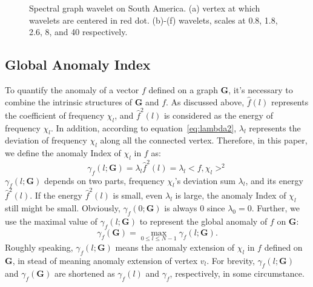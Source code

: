 \begin{figure}[t]
{		\label{fig:brazil5}
	}
	\caption{Spectral graph wavelet on South America. (a) vertex at which wavelets are centered in red dot. (b)-(f) wavelets, scales at 0.8, 1.8, 2.6, 8, and 40 respectively.}
	\label{fig:example2}
\end{figure}


\subsection{Global Anomaly Index}
\label{sec:signal_anomaly_on_Graph}

To quantify the anomaly of a vector $f$ defined on a graph $\mathbf{G}$, it's necessary to combine the intrinsic structures of $\mathbf{G}$ and $f$. As discussed above, $\hat{f}(l)$ represents the coefficient of frequency $\chi_l$, and $\hat{f}^2(l)$ is considered as the energy of frequency $\chi_l$. In addition, according to equation~\ref{eq:lambda2}, $\lambda_l$ represents the deviation of frequency $\chi_l$ along all the connected vertex. Therefore, in this paper, we define the anomaly Index of $\chi_l$ in $f$ as:
\begin{equation}
\label{eq:lambda3}
\gamma_f(l;\mathbf{G})=\lambda_l\hat{f}^2(l)= \lambda_l<f,\chi_l>^2
\end{equation}
$\gamma_f(l;\mathbf{G})$ depends on two parts, frequency $\chi_l$'s deviation sum $\lambda_l$, and its energy $\hat{f}^2(l)$. If the energy $\hat{f}^2(l)$ is small, even $\lambda_l$ is large, the anomaly Index of $\chi_l$ still might be small. Obviously, $\gamma_f(0;\mathbf{G})$ is always $0$ since $\lambda_0=0$. Further, we use the maximal value of $\gamma_f(l;\mathbf{G})$ to represent the global anomaly of $f$ on $\mathbf{G}$:
\begin{equation}
\label{eq:lambda4}
\gamma_f(\mathbf{G})=\underset{0 \leq l \leq N-1}{\max}{\gamma_f(l;\mathbf{G})}.
\end{equation}
Roughly speaking, $\gamma_f(l;\mathbf{G})$ means the anomaly extension of $\chi_l$ in $f$ defined on $\mathbf{G}$, in stead of meaning anomaly extension of vertex $v_l$.
For brevity, $\gamma_f(l;\mathbf{G})$  and $\gamma_f(\mathbf{G})$ are shortened as $\gamma_f(l)$ and $\gamma_f$, respectively, in some circumstance.


